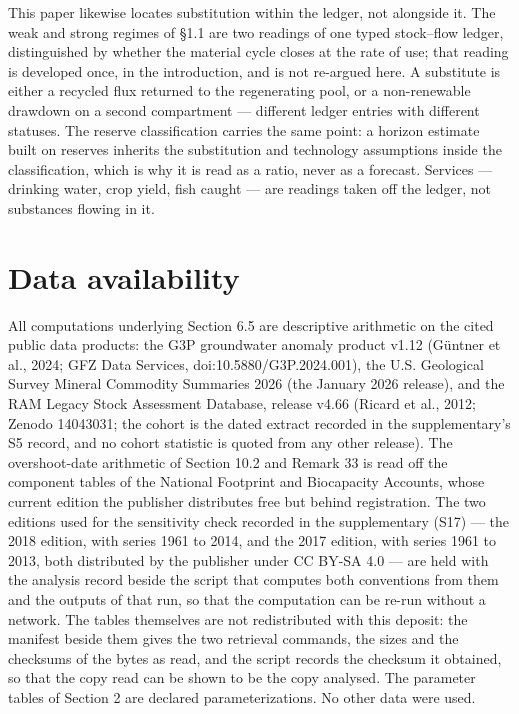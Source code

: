 \documentclass[11pt]{article}
\begin{document}
This paper likewise locates substitution within the ledger, not alongside it. The weak and strong regimes of \S1.1 are two readings of one typed stock--flow ledger, distinguished by whether the material cycle closes at the rate of use; that reading is developed once, in the introduction, and is not re-argued here. A substitute is either a recycled flux returned to the regenerating pool, or a non-renewable drawdown on a second compartment --- different ledger entries with different statuses. The reserve classification carries the same point: a horizon estimate built on reserves inherits the substitution and technology assumptions inside the classification, which is why it is read as a ratio, never as a forecast. Services --- drinking water, crop yield, fish caught --- are readings taken off the ledger, not substances flowing in it.

\vspace{0.8em}

\section*{Data availability}\label{data-availability}

All computations underlying Section 6.5 are descriptive arithmetic on the cited public data products: the G3P groundwater anomaly product v1.12 (G\"{u}ntner et al., 2024; GFZ Data Services, doi:10.5880/\allowbreak{}G3P.2024.001), the U.S. Geological Survey Mineral Commodity Summaries 2026 (the January 2026 release), and the RAM Legacy Stock Assessment Database, release v4.66 (Ricard et al., 2012; Zenodo 14043031; the cohort is the dated extract recorded in the supplementary's S5 record, and no cohort statistic is quoted from any other release). The overshoot-date arithmetic of Section 10.2 and Remark 33 is read off the component tables of the National Footprint and Biocapacity Accounts, whose current edition the publisher distributes free but behind registration. The two editions used for the sensitivity check recorded in the supplementary (S17) --- the 2018 edition, with series 1961 to 2014, and the 2017 edition, with series 1961 to 2013, both distributed by the publisher under CC BY-SA 4.0 --- are held with the analysis record beside the script that computes both conventions from them and the outputs of that run, so that the computation can be re-run without a network. The tables themselves are not redistributed with this deposit: the manifest beside them gives the two retrieval commands, the sizes and the checksums of the bytes as read, and the script records the checksum it obtained, so that the copy read can be shown to be the copy analysed. The parameter tables of Section 2 are declared parameterizations. No other data were used.
\end{document}
